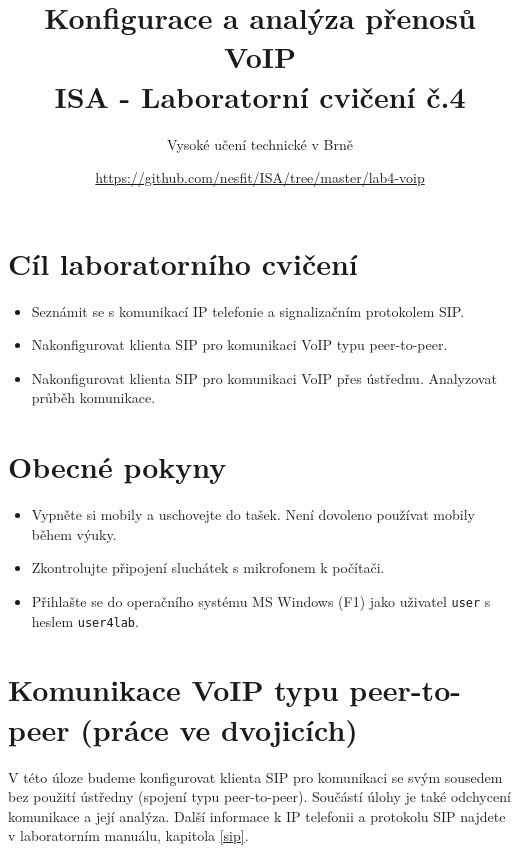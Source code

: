 \documentclass[a4paper,11pt]{article}
\title{Konfigurace a analýza přenosů VoIP\\
{\bf\large ISA - Laboratorní cvičení č.4}}
\author{Vysoké učení technické v Brně}
\date{\url{https://github.com/nesfit/ISA/tree/master/lab4-voip}}
\begin{document}
{\let\newpage\relax\maketitle}
\section*{Cíl laboratorního cvičení}
\begin{itemize}
  \item Seznámit se s komunikací IP telefonie a signalizačním protokolem SIP.
  \item Nakonfigurovat klienta SIP pro komunikaci VoIP typu peer-to-peer.
  \item Nakonfigurovat klienta SIP pro komunikaci VoIP přes ústřednu. Analyzovat průběh komunikace.
\end{itemize}

\section*{Obecné pokyny}
\begin{itemize}
  \item Vypněte si mobily a uschovejte do tašek. Není dovoleno používat mobily během výuky. 
  \item Zkontrolujte připojení sluchátek s mikrofonem k počítači. 
  \item Přihlašte se do operačního systému MS Windows (F1) jako uživatel {\tt user} s heslem {\tt user4lab}.
\end{itemize}

\section{Komunikace VoIP typu peer-to-peer (práce ve dvojicích)}
V této úloze budeme konfigurovat klienta SIP pro komunikaci se svým sousedem bez použití ústředny (spojení typu peer-to-peer). Součástí úlohy je také odchycení komunikace a její analýza. Další informace k IP telefonii a protokolu SIP najdete v laboratorním manuálu, kapitola \ref{sip}. 
\end{document}
